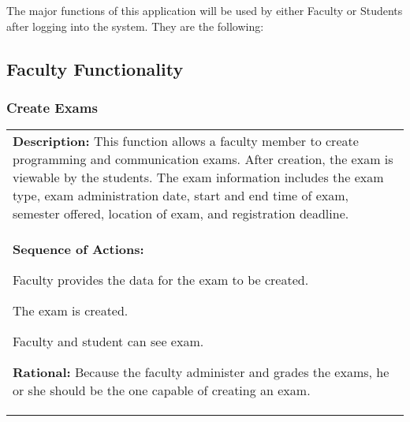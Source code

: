 
\newenvironment{boxed}
 {\begin{center} \begin{tabular}{|p{0.9\textwidth}|}
 \hline
 }
 { 
 \\\hline
 \end{tabular} 
 \end{center}
 }

The major functions of this application will be used by either Faculty or Students
after logging into the system. They are the following:

\subsection{Faculty Functionality}

   \subsubsection{\large Create Exams} 
   \begin{boxed} %
      \textbf{Description:}
      {\small This function allows a faculty member to create programming and
         communication exams. After creation, the exam is viewable by the
         students. The exam information includes the exam type, exam
         administration date, start and end time of exam, semester offered,
         location of exam, and registration deadline.} \\

      \textbf{Sequence of Actions:}
      \begin{enumerate}
            {\small
         \item Faculty provides the data for the exam to be created.
         \item The exam is created.
         \item Faculty and student can see exam.}
      \end{enumerate}

      \textbf{Rational:}
      {\small Because the faculty administer and grades the exams, he or she should
      be the one capable of creating an exam.}
   \end{boxed} %

